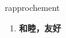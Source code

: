 
\begin{frame}
{\huge rapprochement}
\begin{center}
\begin{enumerate}\Large
  \item \textbf{和睦，友好}
\end{enumerate}
\end{center}
\end{frame}
